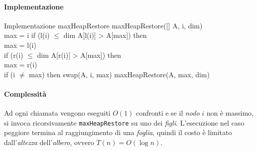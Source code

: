\paragraph{Implementazione}
\begin{minicode}{Implementazione maxHeapRestore}
    \ind maxHeapRestore([] A,  i,  dim)\\
         max = i\hfill{}
        \indf if (l(i) $\leq$ dim A[l(i)] > A[max]) then\\
            max = l(i)\\
        \indf if (r(i) $\leq$ dim A[r(i)] > A[max]) then\\
            max = r(i)\\
        \indf if (i $\neq$ max) then\hfill{}
            swap(A, i, max)\hfill{}
            maxHeapRestore(A, max, dim)\hfill{}
\end{minicode}
\paragraph{Complessità}
Ad ogni chiamata vengono eseguiti $O(1)$ confronti e se il \emph{nodo} $i$ non è
massimo, si invoca ricorsivamente \texttt{maxHeapRestore} su uno dei \emph{figli}.
L'esecuzione nel caso peggiore termina al raggiungimento di una \emph{foglia},
quindi il costo è limitato dall'\emph{altezza} dell'\emph{albero}, ovvero
$T(n)=O(\log n)$.

